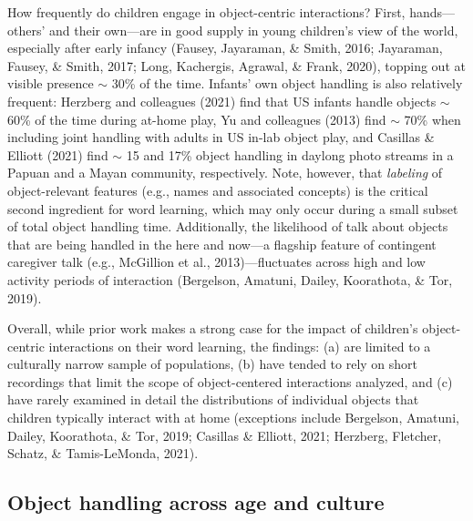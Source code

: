 \documentclass[10pt, letterpaper]{article}
\begin{document}
How frequently do children engage in object-centric interactions? First,
hands---others' and their own---are in good supply in young children's
view of the world, especially after early infancy (Fausey, Jayaraman, \&
Smith, 2016; Jayaraman, Fausey, \& Smith, 2017; Long, Kachergis,
Agrawal, \& Frank, 2020), topping out at visible presence \(\sim\) 30\%
of the time. Infants' own object handling is also relatively frequent:
Herzberg and colleagues (2021) find that US infants handle objects
\(\sim\) 60\% of the time during at-home play, Yu and colleagues (2013)
find \(\sim\) 70\% when including joint handling with adults in US
in-lab object play, and Casillas \& Elliott (2021) find \(\sim\) 15 and
17\% object handling in daylong photo streams in a Papuan and a Mayan
community, respectively. Note, however, that \emph{labeling} of
object-relevant features (e.g., names and associated concepts) is the
critical second ingredient for word learning, which may only occur
during a small subset of total object handling time. Additionally, the
likelihood of talk about objects that are being handled in the here and
now---a flagship feature of contingent caregiver talk (e.g., McGillion
et al., 2013)---fluctuates across high and low activity periods of
interaction (Bergelson, Amatuni, Dailey, Koorathota, \& Tor, 2019).

Overall, while prior work makes a strong case for the impact of
children's object-centric interactions on their word learning, the
findings: (a) are limited to a culturally narrow sample of populations,
(b) have tended to rely on short recordings that limit the scope of
object-centered interactions analyzed, and (c) have rarely examined in
detail the distributions of individual objects that children typically
interact with at home (exceptions include Bergelson, Amatuni, Dailey,
Koorathota, \& Tor, 2019; Casillas \& Elliott, 2021; Herzberg, Fletcher,
Schatz, \& Tamis-LeMonda, 2021).

\hypertarget{object-handling-across-age-and-culture}{%
\subsection{Object handling across age and
culture}\label{object-handling-across-age-and-culture}}
\end{document}
